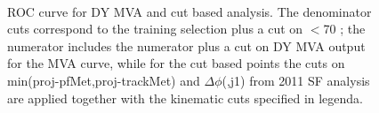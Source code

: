 \begin{figure}[!hbtp]
\begin{center}
\\
\caption{ROC curve for DY MVA and cut based analysis. The denominator cuts correspond to the training selection plus a cut on \mll$<$70 \GeVcc; 
the numerator includes the numerator plus a cut on DY MVA output for the MVA curve, while for the cut based points 
the cuts on min(proj-pfMet,proj-trackMet) and $\Delta\phi$(\Lep\Lep,j1) from 2011 SF analysis are applied together with the kinematic cuts specified in legenda. }
\label{fig:roc}
\end{center}
\end{figure}

